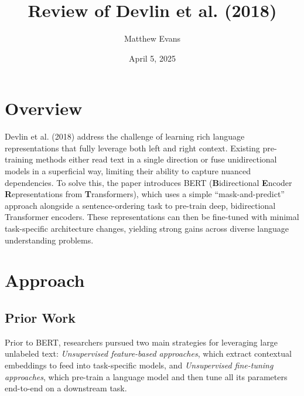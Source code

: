 \documentclass[10pt]{article}
\title{
    Review of Devlin et al. (2018) \\
}
\author{Matthew Evans}
\date{April 5, 2025}
\begin{document}
\maketitle

\section*{Overview}
Devlin et al. (2018) \cite{DBLP:journals/corr/abs-1810-04805} address the challenge of learning rich language representations that fully leverage both left and right context. Existing pre-training methods either read text in a single direction or fuse unidirectional models in a superficial way, limiting their ability to capture nuanced dependencies. To solve this, the paper introduces BERT (\textbf{B}idirectional \textbf{E}ncoder \textbf{R}epresentations from \textbf{T}ransformers), which uses a simple ``mask-and-predict'' approach alongside a sentence-ordering task to pre-train deep, bidirectional Transformer encoders. These representations can then be fine-tuned with minimal task-specific architecture changes, yielding strong gains across diverse language understanding problems.

\section*{Approach}
\subsection*{Prior Work}
Prior to BERT, researchers pursued two main strategies for leveraging large unlabeled text: \textit{Unsupervised feature-based approaches}, which extract contextual embeddings to feed into task-specific models, and \textit{Unsupervised fine-tuning approaches}, which pre-train a language model and then tune all its parameters end-to-end on a downstream task.
\end{document}
